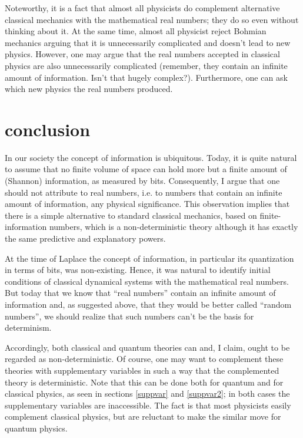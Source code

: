\documentclass[pra,aps,groupedaddress,twocolumn,floatfix,nofootinbib]{revtex4}
\begin{document}
Noteworthy, it is a fact that almost all physicists do complement alternative classical mechanics with the mathematical real numbers; they do so even without thinking about it. At the same time, almost all physicist reject Bohmian mechanics arguing that it is unnecessarily complicated and doesn't lead to new physics. However, one may argue that the real numbers accepted in classical physics are also unnecessarily complicated (remember, they contain an infinite amount of information. Isn't that hugely complex?). Furthermore, one can ask which new physics the real numbers produced.


\section{conclusion}
In our society the concept of information is ubiquitous. Today, it is quite natural to assume that no finite volume of space can hold more but a finite amount of (Shannon) information, as measured by bits. Consequently, I argue that one should not attribute to real numbers, i.e. to numbers that contain an infinite amount of information, any physical significance. This observation implies that there is a simple alternative to standard classical mechanics, based on finite-information numbers, which is a non-deterministic theory although it has exactly the same predictive and explanatory powers.

At the time of Laplace the concept of information, in particular its quantization in terms of bits, was non-existing. Hence, it was natural to identify initial conditions of classical dynamical systems with the mathematical real numbers. But today that we know that ``real numbers'' contain an infinite amount of information and, as suggested above, that they would be better called ``random numbers'', we should realize that such numbers can't be the basis for determinism.

Accordingly, both classical and quantum theories can and, I claim, ought to be regarded as non-deterministic. Of course, one may want to complement these theories with supplementary variables in such a way that the complemented theory is deterministic. Note that this can be done both for quantum and for classical physics, as seen in sections \ref{suppvar} and \ref{suppvar2}; in both cases the supplementary variables are inaccessible. The fact is that most physicists easily complement classical physics, but are reluctant to make the similar move for quantum physics. 
\end{document}
